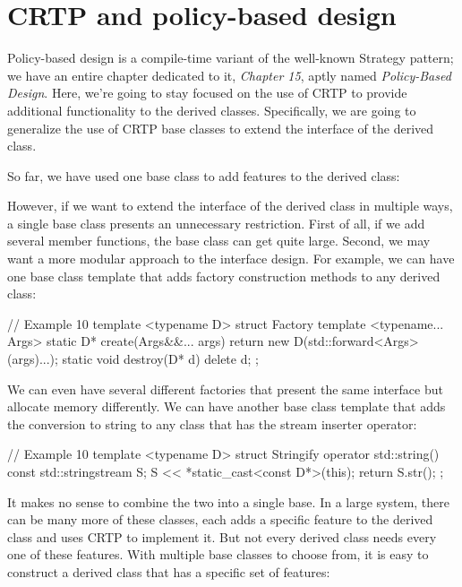 \section{CRTP and policy-based design}

Policy-based design is a compile-time variant of the well-known Strategy pattern; we have an entire chapter dedicated to it, \emph{Chapter 15}, aptly named \emph{Policy-Based Design}. Here, we're going to stay focused on the use of CRTP to provide additional functionality to the derived classes. Specifically, we are going to generalize the use of CRTP base classes to extend the interface of the derived class.

So far, we have used one base class to add features to the derived class:

\begin{code}
template <typename D> struct plus_base {鈥;
class D : public plus_base<D> {鈥;
\end{code}

However, if we want to extend the interface of the derived class in multiple ways, a single base class presents an unnecessary restriction. First of all, if we add several member functions, the base class can get quite large. Second, we may want a more modular approach to the interface design. For example, we can have one base class template that adds factory construction methods to any derived class:

\begin{code}
// Example 10
template <typename D> struct Factory {
  template <typename... Args>
  static D* create(Args&&... args) {
    return new D(std::forward<Args>(args)...);
  }
  static void destroy(D* d) { delete d; }
};
\end{code}

We can even have several different factories that present the same interface but allocate memory differently. We can have another base class template that adds the conversion to string to any class that has the stream inserter operator:

\begin{code}
// Example 10
template <typename D> struct Stringify {
  operator std::string() const {
    std::stringstream S;
    S << *static_cast<const D*>(this);
    return S.str();
  }
};
\end{code}

It makes no sense to combine the two into a single base. In a large system, there can be many more of these classes, each adds a specific feature to the derived class and uses CRTP to implement it. But not every derived class needs every one of these features. With multiple base classes to choose from, it is easy to construct a derived class that has a specific set of features:

